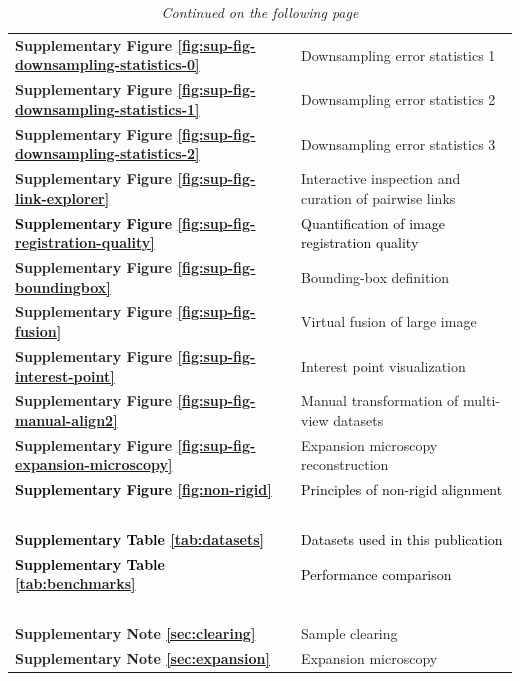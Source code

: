 \documentclass[]{spie}  %
\def\red{\textcolor{black}}
\newcommand\tablespace{\vspace{2.5mm}}
\begin{document}
\begin{table}[h!]
{\begin{tabular}{lp{11cm}}
\textbf{Supplementary Figure \ref{fig:sup-fig-downsampling-statistics-0}} & Downsampling error statistics 1 \tablespace \\
\textbf{Supplementary Figure \ref{fig:sup-fig-downsampling-statistics-1}} & Downsampling error statistics 2 \tablespace \\
\textbf{Supplementary Figure \ref{fig:sup-fig-downsampling-statistics-2}} & Downsampling error statistics 3 \tablespace \\
\textbf{Supplementary Figure \ref{fig:sup-fig-link-explorer}} & Interactive inspection and curation of pairwise links \tablespace \\
\textbf{\red{Supplementary Figure \ref{fig:sup-fig-registration-quality}}} & \red{Quantification of image registration quality}\tablespace \\
\textbf{Supplementary Figure \ref{fig:sup-fig-boundingbox}} & Bounding-box definition \tablespace \\
\textbf{Supplementary Figure \ref{fig:sup-fig-fusion}} & Virtual fusion of large image \tablespace \\
\textbf{Supplementary Figure \ref{fig:sup-fig-interest-point}} & Interest point visualization \tablespace \\
\textbf{Supplementary Figure \ref{fig:sup-fig-manual-align2}} & Manual transformation of multi-view datasets \tablespace \\
\textbf{Supplementary Figure \ref{fig:sup-fig-expansion-microscopy}} & Expansion microscopy reconstruction \tablespace \\
\textbf{\red{Supplementary Figure \ref{fig:non-rigid}}} & \red{Principles of non-rigid alignment}\tablespace \\
\textbf{~} & {~} \tablespace \\
\textbf{\red{Supplementary Table \ref{tab:datasets}}} & \red{Datasets used in this publication} \tablespace \\
\textbf{\red{Supplementary Table \ref{tab:benchmarks}}} & \red{Performance comparison} \tablespace \\
\textbf{~} & {~} \tablespace \\
\textbf{Supplementary Note \ref{sec:clearing}} & Sample clearing \tablespace \\
\textbf{Supplementary Note \ref{sec:expansion}} & Expansion microscopy \tablespace \\
\end{tabular}}
\hspace{10mm}
\caption{\emph{Continued on the following page}}
\end{table}
\end{document}
